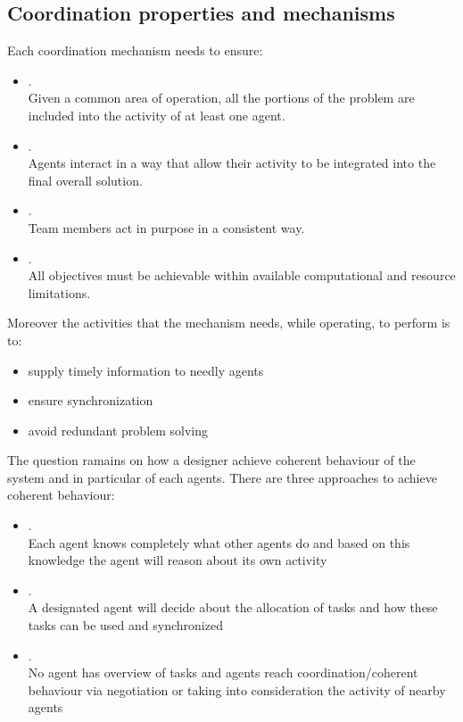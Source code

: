 \subsection{Coordination properties and mechanisms}
Each coordination mechanism needs to ensure:
\begin{itemize}
\item {}. \\
Given a common area of operation, all the portions of the problem are included into the activity of at least one agent.
\item {}.\\
Agents interact in a way that allow their activity to be integrated into the final overall solution.
\item {}.\\
Team members act in purpose in a consistent way.
\item {}.\\
All objectives must be achievable within available computational and resource limitations.
\end{itemize}

Moreover the activities that the mechanism needs, while operating, to perform is to:
\begin{itemize}
\item supply timely information to needly agents
\item ensure synchronization
\item avoid redundant problem solving
\end{itemize}
 
The question ramains on how a designer achieve coherent behaviour of the system and in particular of each agents. There are three approaches to achieve coherent behaviour:
\begin{itemize}
\item {}.\\
Each agent knows completely what other agents do and based on this knowledge the agent will reason about its own activity
\item {}.\\
A designated agent will decide about the allocation of tasks and how these tasks can be used and synchronized
\item {}.\\
No agent has overview of tasks and agents reach coordination/coherent behaviour via negotiation or taking into consideration the activity of nearby agents
\end{itemize}

